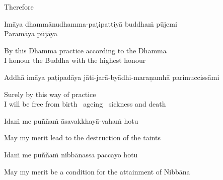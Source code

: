 \begin{cprenglish}
  Therefore
\end{cprenglish}

Imāya dhammānudhamma-paṭipattiyā buddhaṁ pūjemi\\
Paramāya pūjāya

\begin{cprenglish}
  By this Dhamma practice according to the Dhamma\\
  I honour the Buddha with the highest honour
\end{cprenglish}

Addhā imāya paṭipadāya jāti-jarā-byādhi-maraṇamhā parimuccissāmi

\begin{cprenglish}
  Surely by this way of practice\\
  I will be free from birth \breathmark\ ageing \breathmark\ sickness and death
\end{cprenglish}

Idaṁ me puññaṁ āsavakkhayā-vahaṁ hotu

\begin{cprenglish}
  May my merit lead to the destruction of the taints
\end{cprenglish}

Idaṁ me puññaṁ nibbānassa paccayo hotu

\begin{cprenglish}
  May my merit be a condition for the attainment of Nibbāna
\end{cprenglish}


\clearpage
